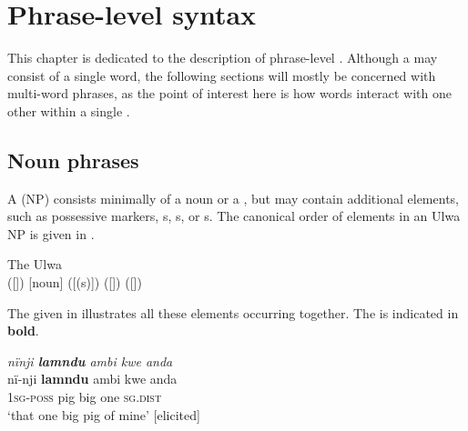 \chapter{Phrase-level syntax}\label{sec:9}


This chapter is dedicated to the description of phrase-level . Although a  may consist of a single word, the following sections will mostly be concerned with multi-word phrases, as the point of interest here is how words interact with one other within a single .


\section{Noun phrases}\label{sec:9.1}


A  (NP) consists minimally of a noun or a , but may contain additional elements, such as  possessive markers, s, s, or s. The canonical order of elements in an Ulwa NP is given in .

\ea%
    \label{ex:phrase:1}
            The Ulwa \\
    ([]) [noun] ([(s)]) ([]) ([])
\z

The  given in  illustrates all these elements occurring together. The  is indicated in \textbf{bold}.

\ea%
    \label{ex:phrase:2}
            \textit{nïnji \textbf{lamndu} ambi kwe anda}\\
\gll    nï-nji    \textbf{lamndu}  ambi  kwe  anda\\
    1\textsc{sg-poss}  pig      big    one    \textsc{sg.dist}\\
\glt `that one big pig of mine’ [elicited]
\z

